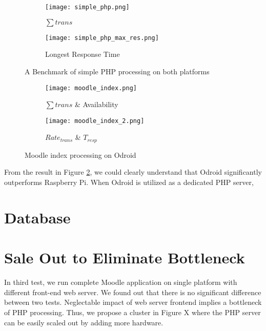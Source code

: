 \begin{figure}[h]
\centering
\begin{subfigure}{0.45\textwidth}
\centering
\texttt{[image: simple\_php.png]}
\caption{$\sum trans$}
\end{subfigure}
\begin{subfigure}{0.45\textwidth}
\centering
\texttt{[image: simple\_php\_max\_res.png]}
\caption{Longest Response Time}
\end{subfigure}
\caption{A Benchmark of simple PHP processing on both platforms}
\label{simple_php}
\end{figure}

\begin{figure}[h]
\centering
\begin{subfigure}{0.45\textwidth}
\centering
\texttt{[image: moodle\_index.png]}
\caption{$\sum trans$ \& Availability}
\end{subfigure}
\begin{subfigure}{0.45\textwidth}
\centering
\texttt{[image: moodle\_index\_2.png]}
\caption{$Rate_{trans}$ \& $T_{resp}$}
\end{subfigure}
\caption{Moodle index processing on Odroid}
\label{moodle_php_result}
\end{figure}

From the result in Figure \ref{moodle_php_result}, we could clearly understand that Odroid significantly outperforms Raspberry Pi. When Odroid is utilized as a dedicated PHP server, 

\section{Database}

\section{Sale Out to Eliminate Bottleneck}
In third test, we run complete Moodle application on single platform with different front-end web server. We found out that there is no significant difference between two tests. Neglectable impact of web server frontend implies a bottleneck of PHP processing. Thus, we propose a cluster in Figure X where the PHP server can be easily scaled out by adding more hardware.

